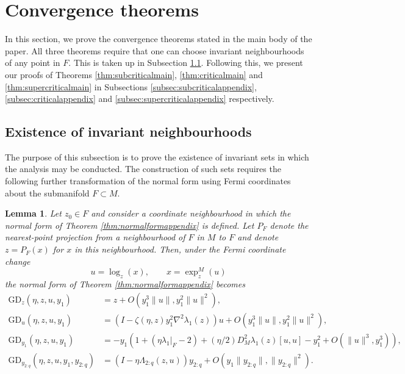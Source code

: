 \documentclass{article}
\newcommand{\GD}{\mathrm{GD}}
\theoremstyle{plain}
\newtheorem{lemma}[theorem]{Lemma}
\theoremstyle{definition}
\theoremstyle{remark}
\begin{document}
\section{Convergence theorems}

In this section, we prove the convergence theorems stated in the main body of the paper. All three theorems require that one can choose invariant neighbourhoods of any point in $F$. This is taken up in Subsection \ref{subsec:invariantneighourhoodappendix}. Following this, we present our proofs of Theorems \ref{thm:subcriticalmain}, \ref{thm:criticalmain} and \ref{thm:supercriticalmain} in Subsections \ref{subsec:subcriticalappendix}, \ref{subsec:criticalappendix} and \ref{subsec:supercriticalappendix} respectively.

\subsection{Existence of invariant neighbourhoods}\label{subsec:invariantneighourhoodappendix}

The purpose of this subsection is to prove the existence of invariant sets in which the analysis may be conducted. The construction of such sets requires the following further transformation of the normal form using Fermi coordinates about the submanifold $F\subset M$.

\begin{lemma}\label{lem:fermicoordinates}
    Let $z_0\in F$ and consider a coordinate neighbourhood in which the normal form of Theorem \ref{thm:normalformappendix} is defined. Let $P_F$ denote the nearest-point projection from a neighbourhood of $F$ in $M$ to $F$ and denote $z = P_F(x)$ for $x$ in this neighbourhood. Then, under the Fermi coordinate change
    \begin{equation}
    u = \log_z(x),\qquad x= \exp^M_z(u)
    \end{equation}
    the normal form of Theorem \ref{thm:normalformappendix} becomes
    \begin{align}
    \GD_z(\eta,z,u,y_1) &= z + O(y_1^3\|u\|,y_1^2\|u\|^2),\\
    \GD_u(\eta,z,u,y_1) &= (I-\zeta(\eta,z)y_1^2\nabla^2\lambda_1(z))u + O(y_1^3\|u\|,y_1^2\|u\|^2),\\
    \GD_{y_1}(\eta,z,u,y_1) &= -y_1(1+(\eta\lambda_1|_F-2) + (\eta/2)D^2_M\lambda_1(z)[u,u] - y_1^2 + O(\|u\|^3,y_1^3)),\\
    \GD_{y_{2:q}}(\eta,z,u,y_1,y_{2:q}) &= (I-\eta\Lambda_{2:q}(z,u))y_{2:q} + O(y_1\|y_{2:q}\|,\|y_{2:q}\|^2).
    \end{align}
\end{lemma}
\end{document}
